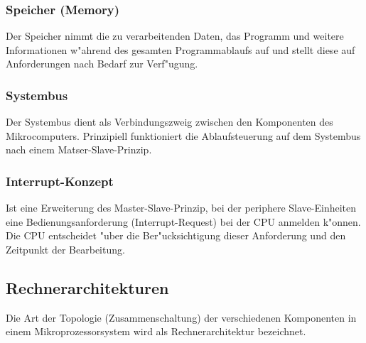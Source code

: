 \begin{minipage}[t]{8.5cm}
	\subsubsection{Speicher (Memory)}
	Der Speicher nimmt die zu verarbeitenden Daten, das Programm und weitere Informationen w"ahrend des gesamten Programmablaufs auf und stellt diese auf Anforderungen nach Bedarf zur Verf"ugung.\\
	
	\subsubsection{Systembus}
	Der Systembus dient als Verbindungszweig zwischen den Komponenten des Mikrocomputers. Prinzipiell funktioniert die Ablaufsteuerung auf dem Systembus nach einem Matser-Slave-Prinzip.\\
	
	\subsubsection{Interrupt-Konzept}
	Ist eine Erweiterung des Master-Slave-Prinzip, bei der periphere Slave-Einheiten eine Bedienungsanforderung (Interrupt-Request) bei der CPU anmelden k"onnen. Die CPU entscheidet "uber die Ber"ucksichtigung dieser Anforderung und den Zeitpunkt der Bearbeitung.
\end{minipage}

\subsection{Rechnerarchitekturen}
Die Art der Topologie (Zusammenschaltung) der verschiedenen Komponenten in einem Mikroprozessorsystem wird als Rechnerarchitektur bezeichnet.

